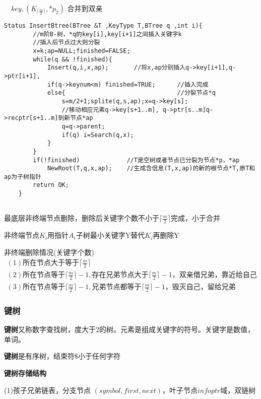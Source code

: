 \documentclass[UTF8]{ctexart}
\newcommand{\mt}[1]{\text{#1}}
\newcommand{\mb}[1]{\textbf{#1}}
\newcommand{\mfd}[1]{ \lceil #1 \rceil}
\newcommand{\q}{\quad}
\newcommand{\ma}[1]{\begin{array}{llll} #1 \end{array}}
\begin{document}
$\q key,(K_{\mfd{\frac{m}{2}}},*p_2) $ 合并到双亲


\newpage

\begin{lstlisting}[style=v1]
    Status InsertBtree(BTree &T ,KeyType T,BTree q ,int i){
        //m阶B-树，*q的key[i],key[i+1]之间插入关键字k
        //插入后节点过大则分裂
        x=k;ap=NULL;finished=FALSE;
        while(q && !finished){
            Insert(q,i,x,ap);       //将x,ap分别插入q->key[i+1],q->ptr[i+1],
            if(q->keynum<m) finished=TRUE;      //插入完成
            else{                               //分裂节点*q
                s=m/2+1;splite(q,s,ap);x=q->key[s];   
                //移动相应元素q->key[s+1..m], q->ptr[s..m]q->recptr[s+1..m]到新节点*ap
                q=q->parent;
                if(q) i=Search(q,x);
            }
        }
        if(!finished)             //T是空树或者节点已分裂为节点*p，*ap      
            NewRoot(T,q,x,ap);    //生成含信息(T,x,ap)的新的根节点*T,原T和ap为子树指针 
        return OK;
    }
   
\end{lstlisting}

最底层非终端节点删除，删除后关键字个数不小于$\mfd{\frac{m}{2}}$完成，小于合并

非终端节点$K_i$用指针$A_i$子树最小关键字Y替代$K_i$再删除Y

非终端删除情况(关键字个数)$\ma{
    (1) \mt{所在节点大于等于} \mfd{\frac{m}{2}}\\
    (2) \mt{所在节点等于} \mfd{\frac{m}{2}}-1 ,\mt{存在兄弟节点大于} \mfd{\frac{m}{2}}-1，\mt{双亲借兄弟，靠近给自己}\\
    (3) \mt{所在节点等于} \mfd{\frac{m}{2}}-1 ,\mt{兄弟节点都等于} \mfd{\frac{m}{2}}-1，\mt{毁灭自己，留给兄弟}
}$

\subsubsection{键树}

\mb{键树}又称数字查找树，度大于2的树。元素是组成关键字的符号。关键字是数值，单词。

\mb{键树}是有序树，结束符$\$$小于任何字符

\mb{键树存储结构}\q

    (1)孩子兄弟链表，分支节点 $(symbol,first,next)$，叶子节点$infoptr$域，双链树
\end{document}
